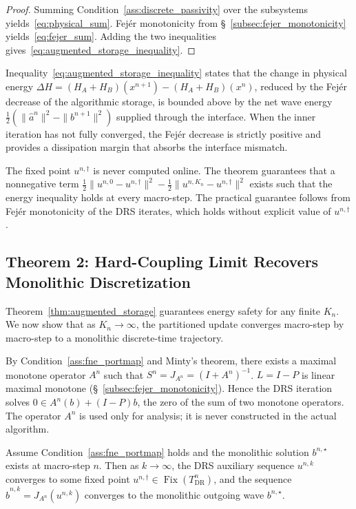 \begin{proof}
Summing Condition~\ref{ass:discrete_passivity} over the subsystems yields~\eqref{eq:physical_sum}. Fejér monotonicity from \S~\ref{subsec:fejer_monotonicity} yields~\eqref{eq:fejer_sum}. Adding the two inequalities gives~\eqref{eq:augmented_storage_inequality}.
\end{proof}

Inequality~\eqref{eq:augmented_storage_inequality} states that the change in physical energy $\Delta H = (H_A+H_B)(x^{n+1}) - (H_A+H_B)(x^n)$, reduced by the Fejér decrease of the algorithmic storage, is bounded above by the net wave energy $\frac{1}{2}(\|\hat{a}^n\|^2 - \|b^{n+1}\|^2)$ supplied through the interface. When the inner iteration has not fully converged, the Fejér decrease is strictly positive and provides a dissipation margin that absorbs the interface mismatch.

The fixed point $u^{n,\dagger}$ is never computed online. The theorem guarantees that a nonnegative term $\frac{1}{2}\|u^{n,0}-u^{n,\dagger}\|^2 - \frac{1}{2}\|u^{n,K_n}-u^{n,\dagger}\|^2$ exists such that the energy inequality holds at every macro-step. The practical guarantee follows from Fejér monotonicity of the DRS iterates, which holds without explicit value of $u^{n,\dagger}$.

\subsection{Theorem 2: Hard-Coupling Limit Recovers Monolithic Discretization}
\label{subsec:theorem2}

Theorem~\ref{thm:augmented_storage} guarantees energy safety for any finite $K_n$. We now show that as $K_n \to \infty$, the partitioned update converges macro-step by macro-step to a monolithic discrete-time trajectory.

By Condition~\ref{ass:fne_portmap} and Minty's theorem, there exists a maximal monotone operator $A^n$ such that $S^n = J_{A^n} = (I + A^n)^{-1}$. $L = I-P$ is linear maximal monotone (\S~\ref{subsec:fejer_monotonicity}). Hence the DRS iteration solves $0 \in A^n(b) + (I-P)b$, the zero of the sum of two monotone operators. The operator $A^n$ is used only for analysis; it is never constructed in the actual algorithm.

\begin{lemma}
\label{lem:drs_convergence}
Assume Condition~\ref{ass:fne_portmap} holds and the monolithic solution $b^{n,\star}$ exists at macro-step $n$. Then as $k \to \infty$, the DRS auxiliary sequence $u^{n,k}$ converges to some fixed point $u^{n,\dagger} \in \operatorname{Fix}(T_{\text{DR}}^n)$, and the sequence $\hat{b}^{n,k} = J_{A^n}(u^{n,k})$ converges to the monolithic outgoing wave $b^{n,\star}$.
\end{lemma}

